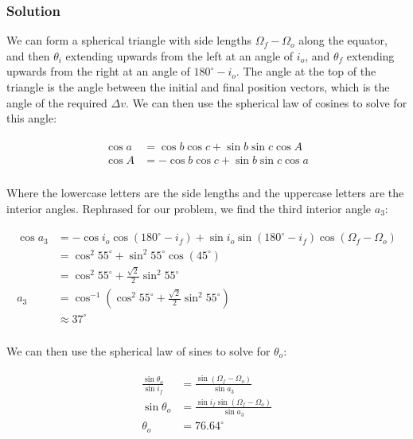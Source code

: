 \documentclass[
]{article}
\begin{document}
\subsubsection{Solution}\label{solution}

We can form a spherical triangle with side lengths
\(\Omega_f - \Omega_o\) along the equator, and then \(\theta_i\)
extending upwards from the left at an angle of \(i_o\), and \(\theta_f\)
extending upwards from the right at an angle of \(180^\circ-i_o\). The
angle at the top of the triangle is the angle between the initial and
final position vectors, which is the angle of the required \(\Delta v\).
We can then use the spherical law of cosines to solve for this angle:

\[\begin{aligned}
\begin{aligned}
    \cos a &= \cos b \cos c + \sin b \sin c \cos A \\
    \cos A &= - \cos b \cos c + \sin b \sin c \cos a \\
\end{aligned}
\end{aligned}\]

Where the lowercase letters are the side lengths and the uppercase
letters are the interior angles. Rephrased for our problem, we find the
third interior angle \(a_3\):

\[\begin{aligned}
\begin{aligned}
    \cos a_3 &= - \cos i_o \cos (180^\circ - i_f) + \sin i_o \sin (180^\circ - i_f) \cos(\Omega_f - \Omega_o) \\
    &= \cos^2 55^\circ + \sin^2 55^\circ \cos(45^\circ) \\
    &= \cos^2 55^\circ + \frac{\sqrt{2}}{2} \sin^2 55^\circ \\
    a_3 &= \cos^{-1} \left( \cos^2 55^\circ + \frac{\sqrt{2}}{2} \sin^2 55^\circ \right) \\
    &\approx 37^\circ \\
\end{aligned}
\end{aligned}\]

We can then use the spherical law of sines to solve for \(\theta_o\):

\[\begin{aligned}
\begin{aligned}
    \frac{\sin\theta_o}{\sin i_f} &= \frac{\sin(\Omega_f - \Omega_o)}{\sin a_3} \\
    \sin\theta_o &= \frac{\sin i_f \sin(\Omega_f - \Omega_o)}{\sin a_3} \\
    \theta_o &= 76.64^\circ \\
\end{aligned}
\end{aligned}\]
\end{document}
